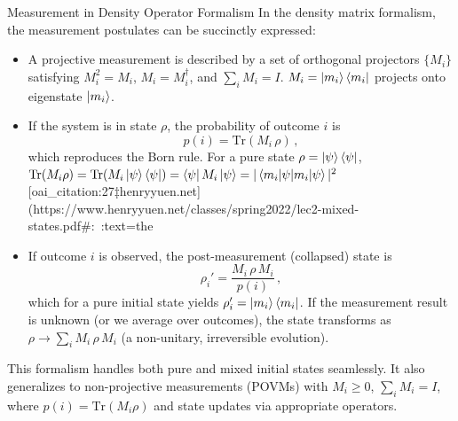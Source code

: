\begin{frame}{Measurement in Density Operator Formalism}
  In the density matrix formalism, the measurement postulates can be succinctly expressed:
  \begin{itemize}
    \item A projective measurement is described by a set of orthogonal projectors $\{M_i\}$ satisfying $M_i^2 = M_i$, $M_i = M_i^\dagger$, and $\sum_i M_i = I$. $M_i = \ket{m_i}\bra{m_i}$ projects onto eigenstate $\ket{m_i}$.
    \item If the system is in state $\rho$, the probability of outcome $i$ is 
      \[
         p(i) = \mathrm{Tr}(M_i\, \rho)\,,
      \] 
      which reproduces the Born rule. For a pure state $\rho=\ket{\psi}\bra{\psi}$, $\mathrm{Tr}(M_i\rho) = \mathrm{Tr}(M_i \ket{\psi}\bra{\psi}) = \bra{\psi}M_i\ket{\psi} = |\braket{m_i|\psi}|^2$ [oai_citation:27‡henryyuen.net](https://www.henryyuen.net/classes/spring2022/lec2-mixed-states.pdf#:~:text=the%
    \item If outcome $i$ is observed, the post-measurement (collapsed) state is 
      \[
         \rho_i' = \frac{M_i \, \rho\, M_i}{p(i)}\,,
      \] 
      which for a pure initial state yields $\rho_i' = \ket{m_i}\bra{m_i}$. If the measurement result is unknown (or we average over outcomes), the state transforms as $\rho \to \sum_i M_i \, \rho\, M_i$ (a non-unitary, irreversible evolution).
  \end{itemize}
  This formalism handles both pure and mixed initial states seamlessly. It also generalizes to non-projective measurements (POVMs) with $M_i \ge 0$, $\sum_i M_i=I$, where $p(i)=\mathrm{Tr}(M_i\rho)$ and state updates via appropriate operators.
\end{frame}

